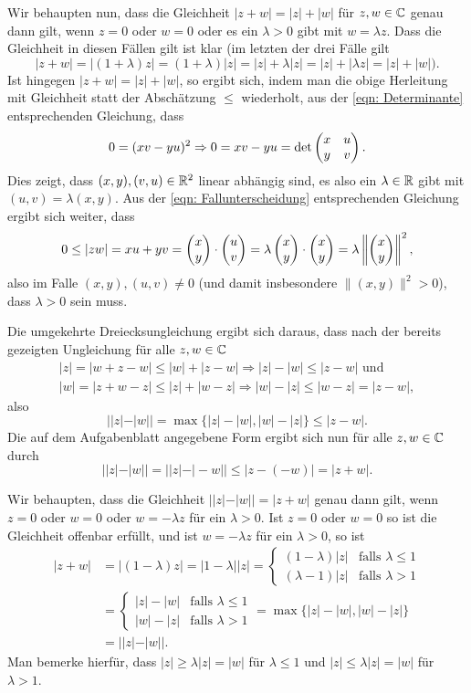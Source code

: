 \documentclass[a4paper,10pt]{article}
\begin{document}
Wir behaupten nun, dass die Gleichheit $|z+w| = |z|+|w|$ für $z, w \in \mathbb{C}$ genau dann gilt, wenn $z = 0$ oder $w = 0$ oder es ein $\lambda > 0$ gibt mit $w = \lambda z$. Dass die Gleichheit in diesen Fällen gilt ist klar (im letzten der drei Fälle gilt \[
 |z+w| = |(1+\lambda)z| = (1+\lambda)|z| = |z| + \lambda|z| = |z| + |\lambda z| = |z|+|w| ).
\]
Ist hingegen $|z+w| = |z|+|w|$, so ergibt sich, indem man die obige Herleitung mit Gleichheit statt der Abschätzung $\leq$ wiederholt, aus der \eqref{eqn: Determinante} entsprechenden Gleichung, dass
\[
 0 = (xv-yu)^2 \Rightarrow 0 = xv-yu = \det \begin{pmatrix}x&u\\y&v\end{pmatrix}.
\]
Dies zeigt, dass $(x,y), (v,u) \in \mathbb{R}^2$ linear abhängig sind, es also ein $\lambda \in \mathbb{R}$ gibt mit $(u,v) = \lambda (x,y)$. Aus der \eqref{eqn: Fallunterscheidung} entsprechenden Gleichung ergibt sich weiter, dass
\[
 0
 \leq |zw| = xu+yv
 = \begin{pmatrix}x\\y\end{pmatrix} \cdot \begin{pmatrix}u\\v\end{pmatrix}
 = \lambda \begin{pmatrix}x\\y\end{pmatrix} \cdot \begin{pmatrix}x\\y\end{pmatrix}
 = \lambda \left\|\begin{pmatrix}x\\y\end{pmatrix}\right\|^2,
\]
also im Falle $(x,y), (u,v) \neq 0$ (und damit insbesondere $\|(x,y)\|^2 > 0$), dass $\lambda > 0$ sein muss.

Die umgekehrte Dreiecksungleichung ergibt sich daraus, dass nach der bereits gezeigten Ungleichung für alle $z, w \in \mathbb{C}$
\begin{gather*}
 |z| = |w+z-w| \leq |w| + |z-w| \Rightarrow |z|-|w| \leq |z-w| \text{ und} \\
 |w| = |z+w-z| \leq |z|+|w-z| \Rightarrow |w|-|z| \leq |w-z| = |z-w|,
\end{gather*}
also
\[
 ||z|-|w|| = \max \{ |z|-|w|, |w|-|z|\} \leq |z-w|.
\]
Die auf dem Aufgabenblatt angegebene Form ergibt sich nun für alle $z, w \in \mathbb{C}$ durch
\[
 ||z|-|w|| =||z|-|-w|| \leq |z-(-w)| = |z+w|.
\]

Wir behaupten, dass die Gleichheit $||z|-|w|| = |z+w|$ genau dann gilt, wenn $z=0$ oder $w=0$ oder $w = -\lambda z$ für ein $\lambda > 0$. Ist $z = 0$ oder $w = 0$ so ist die Gleichheit offenbar erfüllt, und ist $w = -\lambda z$ für ein $\lambda > 0$, so ist
\begin{align*}
 |z+w|
 &= |(1-\lambda)z| = |1-\lambda| |z|
 =
 \begin{cases}
  (1-\lambda) |z| & \text{falls } \lambda \leq 1 \\
  (\lambda-1) |z| & \text{falls } \lambda > 1
 \end{cases} \\
 &=
 \begin{cases}
  |z|-|w| &\text{falls } \lambda \leq 1 \\
  |w|-|z| &\text{falls } \lambda > 1
 \end{cases}
 = \max\{|z|-|w|, |w|-|z|\} \\
 &= ||z|-|w||.
\end{align*}
Man bemerke hierfür, dass $|z| \geq \lambda |z| = |w|$ für $\lambda \leq 1$ und $|z| \leq \lambda |z| = |w|$ für $\lambda > 1$.
\end{document}
